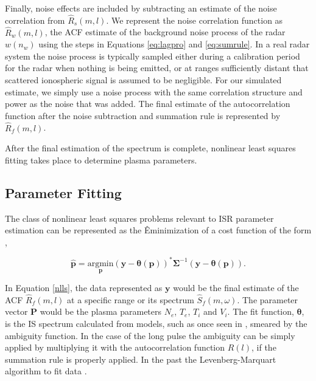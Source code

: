 Finally, noise effects are included by subtracting an estimate of the noise correlation from $\widehat{R}_s(m,l)$.  We represent the noise correlation function as $\widehat{R}_w(m,l)$, the ACF estimate of the background noise process of the radar $w(n_w)$ using the steps in Equations \ref{eq:lagpro} and \ref{eq:sumrule}. In a real radar system the noise process is typically sampled either during a calibration period for the radar when nothing is being emitted, or at ranges sufficiently distant that scattered ionospheric signal is assumed to be negligible. For our simulated estimate, we simply use a noise process with the same correlation structure and power as the noise that was added. The final estimate of the autocorrelation function after the noise subtraction and summation rule is represented by $\widehat{R}_f(m,l)$.


After the final estimation of the spectrum is complete, nonlinear least squares fitting takes place to determine plasma parameters.  

\subsection{Parameter Fitting}
The class of nonlinear least squares problems relevant to ISR parameter estimation can be represented as the Êminimization of a cost function of the form \cite{kayvol1},

\begin{equation}
	\mathbf{\hat{p}}= \underset{\mathbf{p}}{\text{argmin}} (\mathbf{y}-\bm{\theta}(\mathbf{p}))^*\bm{\Sigma}^{-1}(\mathbf{y}-\bm{\theta}(\mathbf{p})).
\label{nlls}
\end{equation}

In Equation \ref{nlls}, the data represented as $\mathbf{y}$ would be the final estimate of the ACF $\widehat{R}_f(m,l)$ at a specific range or its spectrum $\widehat{S}_f(m,\omega)$. The parameter vector $\mathbf{P}$ would be the plasma parameters $N_e$, $T_e$, $T_i$ and $V_i$. The fit function, $\bm{\theta}$, is the IS spectrum calculated from models, such as once seen in \cite{kudeki:milla:1}, smeared by the ambiguity function. In the case of the long pulse the ambiguity can be simply applied by multiplying it with the autocorrelation function $R(l)$, if the summation rule is properly applied. In the past the Levenberg-Marquart algorithm to fit data \cite{nikoukar2008}.

